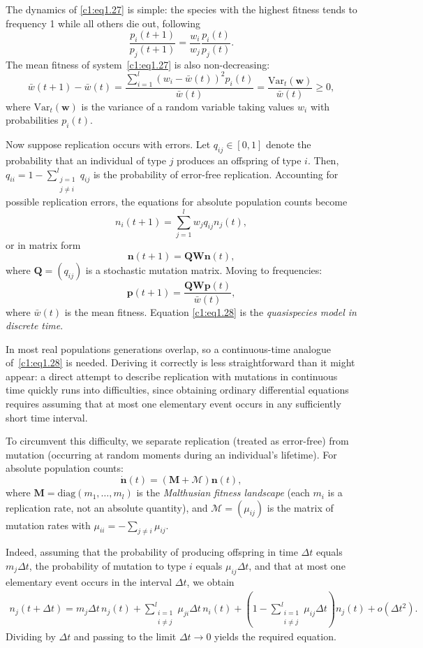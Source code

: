 \documentclass[12pt]{report}
\newcommand{\bs}[1]{\bm{#1}}
\theoremstyle{definition}
\theoremstyle{remark}
\begin{document}
The dynamics of \eqref{c1:eq1.27} is simple: the species with the highest
fitness tends to frequency 1 while all others die out, following
\[
  \frac{p_i(t+1)}{p_j(t+1)}
  =\frac{w_i}{w_j}\frac{p_i(t)}{p_j(t)}.
\]
The mean fitness of system~\eqref{c1:eq1.27} is also non-decreasing:
\[
\bar{w}(t+1)-\bar{w}(t)
=\frac{\sum_{i=1}^{l}(w_i-\bar{w}(t))^2p_i(t)}{\bar{w}(t)}
=\frac{\mathrm{Var}_t(\bs{w})}{\bar{w}(t)}\geqslant 0,
\]
where $\mathrm{Var}_t(\bs{w})$ is the variance of a random variable
taking values $w_i$ with probabilities $p_i(t)$.

Now suppose replication occurs with errors.  Let $q_{ij}\in[0,1]$
denote the probability that an individual of type $j$ produces an
offspring of type $i$.  Then, $q_{ii}=1-\sum_{\substack{j=1\\j\neq i}}^{l}q_{ij}$ is the probability of error-free replication. Accounting for possible
replication errors, the equations for absolute population counts
become 
\[
  n_i(t+1)=\sum_{j=1}^{l}w_j q_{ij}n_j(t),
\]
or in matrix form $$\bs{n}(t+1)=\bs{QW}\bs{n}(t),$$ 
where
$\bs{Q}=(q_{ij})$ is a stochastic mutation matrix.  Moving to frequencies:
\begin{equation}
  \bs{p}(t+1)=\frac{\bs{QW}\bs{p}(t)}{\bar{w}(t)},
  \label{c1:eq1.28}
\end{equation}
where $\bar{w}(t)$ is the mean fitness.
Equation \eqref{c1:eq1.28} is the \emph{quasispecies model in discrete time}.

In most real populations generations overlap, so a continuous-time 
analogue of~\eqref{c1:eq1.28} is needed. Deriving it correctly is 
less straightforward than it might appear: a direct attempt to 
describe replication with mutations in continuous time quickly runs 
into difficulties, since obtaining ordinary differential equations 
requires assuming that at most one elementary event occurs in any 
sufficiently short time interval.

To circumvent this difficulty, we separate
replication (treated as error-free) from mutation (occurring at random
moments during an individual's lifetime).  For absolute population counts:
\[
  \bs{\dot{n}}(t)=(\bs{M}+\bs{\mathcal{M}})\bs{n}(t),
\]
where $\bs{M}=\mathrm{diag}(m_1,\ldots,m_l)$ is the
\emph{Malthusian fitness landscape} (each $m_i$ is a replication rate, not
an absolute quantity), and $\bs{\mathcal{M}}=(\mu_{ij})$ is the
matrix of mutation rates with $\mu_{ii}=-\sum_{j\neq i}\mu_{ij}$.

Indeed, assuming that the probability of producing offspring in time 
$\Delta t$ equals $m_j\Delta t$, the probability of mutation to 
type $i$ equals $\mu_{ij}\Delta t$, and that at most one elementary 
event occurs in the interval $\Delta t$, we obtain
\begin{multline*}
	n_j(t+\Delta t) = m_j\Delta t\, n_j(t)
	+ \sum_{\substack{i=1\\i\neq j}}^{l}\mu_{ji}\Delta t\, n_i(t)
	+ \left(1-\sum_{\substack{i=1\\i\neq j}}^{l}
	\mu_{ij}\Delta t\right)n_j(t)
	+ o(\Delta t^{2}).
\end{multline*}
Dividing by $\Delta t$ and passing to the limit $\Delta t\to 0$
yields the required equation.
\end{document}
